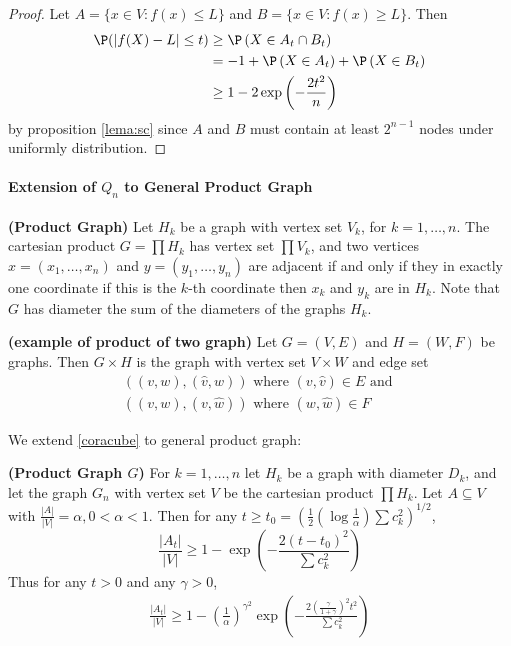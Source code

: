 \documentclass{article}
\newcommand{\bfs}[1]{\textbf{({#1})}}
\begin{document}
\begin{proof}
Let $A =\{ x \in V : f ( x ) \leq L \}$ and $B =\{ x \in V : f ( x ) \geq L \}$. Then
$$
\begin{aligned}
\P (| f ( X )- L | \leq t) &\geq \P \left( X \in A _{ t } \cap B _{ t }\right) \\
&=-1+ \P \left( X \in A _{ t }\right)+ \P \left( X \in B _{ t }\right)\\
& \geq 1-2 \exp \left(-\frac{2 t ^{2} }{ n} \right)
\end{aligned}
$$
by proposition \cref{lema:sc} since $A$ and $B$ must contain at least $2^{n-1}$ nodes under uniformly distribution.
\end{proof}
\paragraph{Extension of $Q_n$ to General Product Graph}
\begin{defa}{\bfs{Product Graph}}
Let $H_{ k }$ be a graph with vertex set $V _{ k }$, for $k =1, \ldots, n$. The cartesian product $G =\prod H _{ k }$ has vertex set $\prod V _{ k }$, and two vertices $x =\left( x _{1}, \ldots, x _{ n }\right)$ and
$y =\left( y _{1}, \ldots, y _{ n }\right)$ are adjacent if and only if they  in exactly one coordinate  if this is the $k$-th coordinate then $x_{k}$ and $y_{k}$ are  in $H_{k} .$ Note that $G$ has diameter the sum of the diameters of the graphs $H _{ k }$.
\end{defa}
\begin{rema}{\bfs{example of product of two graph}}
Let $G=(V, E)$ and $H=(W, F)$ be graphs. Then $G \times H$ is the graph with vertex set $V \times W$ and edge set
$$
\begin{array}{l}
((v, w),(\hat{v}, w)) \text { where }(v, \hat{v}) \in E \text { and } \\
((v, w),(v, \hat{w})) \text { where }(w, \hat{w}) \in F
\end{array}
$$
\end{rema}
We extend \cref{coracube} to general product graph:
\begin{cora}{\bfs{Product Graph $G$}}\label{coraeee}
 For $k =1, \ldots, n$ let $H _{ k }$ be a graph with diameter $D _{ k }$, and let the graph $G _{ n }$ with vertex set $V$ be the cartesian product $\prod H _{ k }$. Let $A \subseteq V$
with $\frac{|A|}{|V|}=\alpha, 0<\alpha<1 .$ Then for any $t \geq t_{0}=\left(\frac{1}{2}\left(\log \frac{1}{\alpha}\right) \sum c_{k}^{2}\right)^{1 / 2}$,
$$
\frac{\left|A_{t}\right|}{|V|} \geq 1-\exp \left(-\frac{2\left(t-t_{0}\right)^{2}}{\sum c_{k}^{2}}\right)
$$
Thus for any $t>0$ and any $\gamma>0$,
\begin{align}
    \frac{\left|A_{t}\right|}{|V|} \geq 1-\left(\frac{1}{\alpha}\right)^{\gamma^{2}} \exp \left(-\frac{2\left(\frac{\gamma}{1+\gamma}\right)^{2} t^{2}}{\sum c_{k}^{2}}\right)\label{eqafadsfa}
\end{align}
\end{cora}
\end{document}
